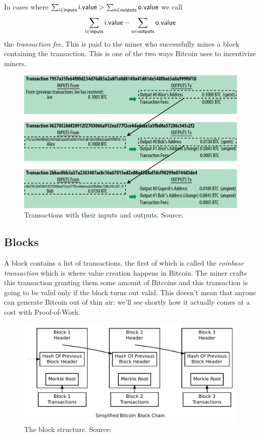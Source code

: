 In cases where $\sum_{\sf i \in inputs} {\sf i.value} > \sum_{\sf o \in outputs} {\sf o.value}$ we call
$$\sum_{\sf i \in inputs} {\sf i.value} - \sum_{\sf o \in outputs} {\sf o.value}$$
the \emph{transaction fee}. This is paid to the miner who successfully mines a block containing the transaction. This is one of the two ways Bitcoin uses to incentivize miners.

\begin{figure}
  \centering
  \includegraphics[width=0.9\columnwidth,keepaspectratio]{figures/transaction-internally.png}
  \caption{Transactions with their inputs and outputs.  Source:~\cite{mastering}}
  \label{fig:transaction-internally}
\end{figure}

\subsection{Blocks}
A block contains a list of transactions, the first of which is called the \emph{coinbase transaction} which is where value creation happens in Bitcoin. The miner crafts this transaction granting them some amount of Bitcoins and this transaction is going to be valid only if the block turns out valid. This doesn't mean that anyone can generate Bitcoin out of thin air: we'll see shortly how it actually comes at a cost with Proof-of-Work.

\begin{figure}
  \centering
  \includegraphics[width=0.9\columnwidth,keepaspectratio]{figures/block-structure.pdf}
  \caption{The block structure.  Source:~\cite{bitcoin}}
  \label{fig:block-structure}
\end{figure}

